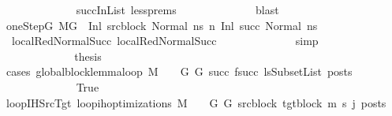 \begin{isabellebody}
\ \ \ \ \ \ \ \ \ \ \ \ \isamarkupfalse%
\ succInList\ less{\isachardot}{\kern0pt}prems{\isacharparenleft}{\kern0pt}{}{\isacharparenright}{\kern0pt}\isanewline
\ \ \ \ \ \ \ \ \ \ \ \ \isamarkupfalse%
\ blast\isanewline
\ \ \ \ \ \ \ \ \ \ \isamarkupfalse%
\ oneStepG{\isacharcolon}{\kern0pt}\ {\isachardoublequoteopen}M{\isacharcomma}{\kern0pt}{\isasymLambda}{\isacharcomma}{\kern0pt}{\isasymGamma}{\isacharcomma}{\kern0pt}{\isasymOmega}{\isacharcomma}{\kern0pt}G\ {\isasymturnstile}\ {\isacharparenleft}{\kern0pt}Inl\ src{\isacharunderscore}{\kern0pt}block{\isacharcomma}{\kern0pt}\ Normal\ ns{\isacharparenright}{\kern0pt}\ {\isacharminus}{\kern0pt}n{\isasymrightarrow}\ {\isacharparenleft}{\kern0pt}Inl\ succ{\isacharcomma}{\kern0pt}\ Normal\ ns{\isacharprime}{\kern0pt}{\isacharparenright}{\kern0pt}{\isachardoublequoteclose}\isanewline
\ \ \ \ \ \ \ \ \ \ \ \ \isamarkupfalse%
\ {\isachardoublequoteopen}{}{\isachardoublequoteclose}{\isacharparenleft}{\kern0pt}{}{\isacharparenright}{\kern0pt}\ local{\isachardot}{\kern0pt}RedNormalSucc{\isacharparenleft}{\kern0pt}{}{\isacharparenright}{\kern0pt}\ local{\isachardot}{\kern0pt}RedNormalSucc{\isacharparenleft}{\kern0pt}{}{\isacharparenright}{\kern0pt}\isanewline
\ \ \ \ \ \ \ \ \ \ \ \ \isamarkupfalse%
\ simp\isanewline
\ \ \ \ \ \ \ \ \ \isanewline
\ \ \ \ \ \ \ \ \ \ \isamarkupfalse%
\ \isamarkupfalse%
\ {\isacharquery}{\kern0pt}thesis\isanewline
\ \ \ \ \ \ \ \ \ \ \isamarkupfalse%
\ {\isacharparenleft}{\kern0pt}cases\ {\isachardoublequoteopen}global{\isacharunderscore}{\kern0pt}block{\isacharunderscore}{\kern0pt}lemma{\isacharunderscore}{\kern0pt}loop\ M\ {\isasymLambda}\ {\isasymGamma}\ {\isasymOmega}\ G\ G{\isacharprime}{\kern0pt}\ succ\ {\isacharparenleft}{\kern0pt}f{\isacharparenleft}{\kern0pt}succ{\isacharparenright}{\kern0pt}{\isacharparenright}{\kern0pt}\ lsSubsetList\ posts{\isachardoublequoteclose}{\isacharparenright}{\kern0pt}\isanewline
\ \ \ \ \ \ \ \ \ \ \ \ \isamarkupfalse%
\ True\isanewline
\ \ \ \ \ \ \ \ \ \ \ \ \isamarkupfalse%
\ loopIHSrcTgt{\isacharcolon}{\kern0pt}\ {\isachardoublequoteopen}loop{\isacharunderscore}{\kern0pt}ih{\isacharunderscore}{\kern0pt}optimizations\ M\ {\isasymLambda}\ {\isasymGamma}\ {\isasymOmega}\ G\ G{\isacharprime}{\kern0pt}\ src{\isacharunderscore}{\kern0pt}block\ tgt{\isacharunderscore}{\kern0pt}block\ m{\isacharprime}{\kern0pt}\ s{\isacharprime}{\kern0pt}\ {\isacharparenleft}{\kern0pt}j{\isacharminus}{\kern0pt}{}{\isacharparenright}{\kern0pt}\ posts{\isachardoublequoteclose}\isanewline

\end{isabellebody}

